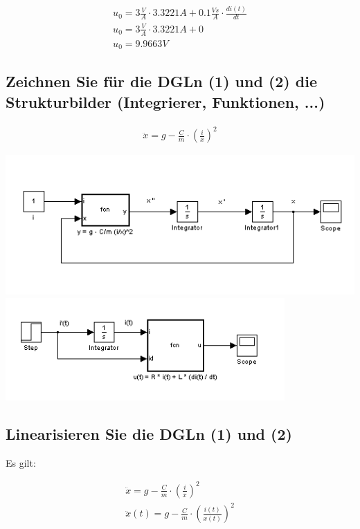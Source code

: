 \documentclass[a4paper,10pt,left=1.5cm,right=1.5cm,top=1.5cm,bottom=1.5cm]{article}
\begin{document}
\begin{eqnarray*}
  u_0 = 3 \frac{V}{A} \cdot 3.3221 A + 0.1 \frac{Vs}{A} \cdot \frac{di(t)}{dt} \\
  u_0 = 3 \frac{V}{A} \cdot 3.3221 A + 0 \\
  u_0 = 9.9663 V
\end{eqnarray*}

\subsection{Zeichnen Sie für die DGLn (1) und (2) die Strukturbilder (Integrierer, Funktionen, ...)}

\begin{eqnarray*}
  \ddot{x} = g - \frac{C}{m} \cdot (\frac{i}{x})^2
\end{eqnarray*}

\includegraphics[width=1\textwidth]{dgl1.png}
\includegraphics[width=0.8\textwidth]{dgl2.png}

\subsection{Linearisieren Sie die DGLn (1) und (2)}

Es gilt:

\begin{eqnarray*}
  \ddot{x} = g - \frac{C}{m} \cdot (\frac{i}{x})^2 \\
  \ddot{x}(t) = g - \frac{C}{m} \cdot (\frac{i(t)}{x(t)})^2 \\
\end{eqnarray*}
\end{document}
